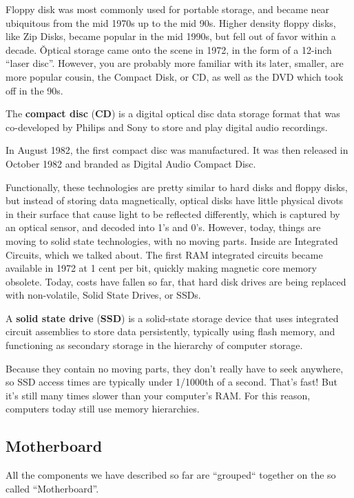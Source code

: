 
Floppy disk was most commonly used for portable storage, and became near ubiquitous from the mid 1970s up to the mid
90s. Higher density floppy disks, like Zip Disks, became popular in the mid 1990s, but fell out of favor within a
decade. \v

Optical storage came onto the scene in 1972, in the form of a 12-inch ``laser disc''. However, you are probably more
familiar with its later, smaller, are more popular cousin, the Compact Disk, or CD, as well as the DVD which took off
in the 90s.

The \textbf{compact disc} (\textbf{CD}) is a digital optical disc data storage format that was co-developed by
Philips and Sony to store and play digital audio recordings.
\ed

In August 1982, the first compact disc was manufactured. It was then released in October 1982 and branded as Digital
Audio Compact Disc.


Functionally, these technologies are pretty similar to hard disks and floppy disks, but instead of storing data
magnetically, optical disks have little physical divots in their surface that cause light to be reflected differently,
which is captured by an optical sensor, and decoded into 1's and 0's. However, today, things are moving to solid
state technologies, with no moving parts. Inside are Integrated Circuits, which we talked about. The first RAM
integrated circuits became available in 1972 at 1 cent per bit, quickly making magnetic core memory obsolete. Today,
costs have fallen so far, that hard disk drives are being replaced with non-volatile, Solid State Drives, or SSDs.

A \textbf{solid state drive} (\textbf{SSD}) is a solid-state storage device that uses integrated circuit assemblies
to store data persistently, typically using flash memory, and functioning as secondary storage in the hierarchy of
computer storage.
\ed


Because they contain no moving parts, they don't really have to seek anywhere, so SSD access times are typically
under 1/1000th of a second. That's fast! But it's still many times slower than your computer's RAM. For this reason,
computers today still use memory hierarchies.

\subsection{Motherboard}
All the components we have described so far are ``grouped`` together on the so called ``Motherboard''.

